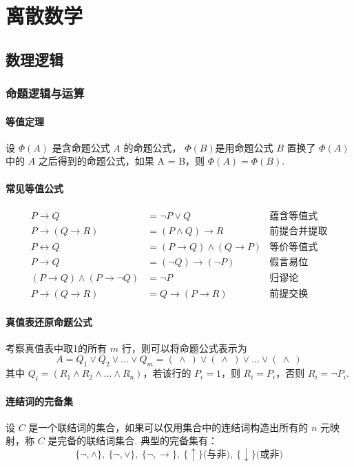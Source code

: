 \documentclass[./main.tex]{subfiles}
\begin{document}
\chapter{离散数学}
\section{数理逻辑}
\subsection{命题逻辑与运算}
\subsubsection{等值定理}
设 $\Phi(A)$ 是含命题公式 $A$ 的命题公式， $\Phi(B)$是用命题公式 $B$ 置换了 $\Phi(A)$ 中的 $A$ 之后得到的命题公式，如果 A = B，则 $ \Phi(A)=\Phi(B) $.
\subsubsection{常见等值公式}
\begin{align}
	P\rightarrow Q&=\neg P\vee Q & \text{蕴含等值式}\\
    P\rightarrow(Q\rightarrow R)&=(P\wedge Q)\rightarrow R &\text{前提合并提取}\\
    P\leftrightarrow Q&=(P\rightarrow Q)\wedge(Q\rightarrow P) &\text{等价等值式}\\
    P\rightarrow Q&=(\neg Q)\rightarrow(\neg P) &\text{假言易位}\\
    (P\rightarrow Q)\wedge(P\rightarrow \neg Q)&=\neg P &\text{归谬论}\\
    P\rightarrow(Q\rightarrow R)&=Q\rightarrow(P\rightarrow R) &\text{前提交换}
\end{align}
\subsubsection{真值表还原命题公式}
考察真值表中取1的所有 $m$ 行，则可以将命题公式表示为 $$A=Q_1\vee Q_2\vee \dots\vee Q_m = (\ \wedge\ )\vee(\ \wedge\ )\vee\dots\vee(\ \wedge\ )$$其中 $Q_i=(R_1\wedge R_2\wedge\dots\wedge R_n)$，若该行的 $P_i=1$，则 $R_i=P_i$，否则 $R_i=\neg P_i$.
\subsubsection{连结词的完备集}
设 $C$ 是一个联结词的集合，如果可以仅用集合中的连结词构造出所有的 $n$ 元映射，称 $C$ 是完备的联结词集合. 典型的完备集有：$$\{\neg,\wedge\},\ \{\neg,\vee\},\ \{\neg,\rightarrow\},\ \{\uparrow\}\text{(与非)},\ \{\downarrow\}\text{(或非)}$$
\end{document}
